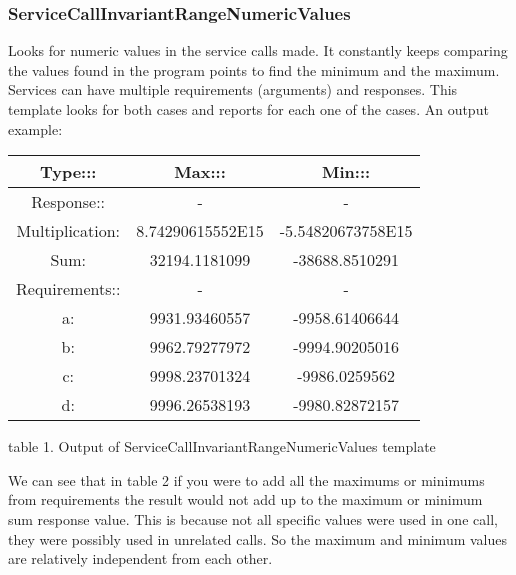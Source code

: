 \documentclass[10pt, conference]{IEEEtran}
\begin{document}
\subsubsection{ServiceCallInvariantRangeNumericValues}
Looks for numeric values in the service calls made. It constantly keeps comparing the values found in the program points to find the minimum and the maximum. Services can have multiple requirements (arguments) and responses. This template looks for both cases and reports for each one of the cases. An output example: 
\begin{table}[h!]

 \begin{tabular}{|c|c|c|} 
\hline
Type::: & Max::: & Min:::  \\
\hline
Response:: & - & - \\
Multiplication: & 8.74290615552E15 &  -5.54820673758E15 \\
Sum:  & 32194.1181099 &  -38688.8510291  \\ 

Requirements::  & - & -\\
a: & 9931.93460557  & -9958.61406644\\
b: & 9962.79277972 & -9994.90205016 \\
c: & 9998.23701324  & -9986.0259562 \\
d: & 9996.26538193 & -9980.82872157 \\ [1ex] 
\hline
 \end{tabular}
 \begin{tablenotes}
	\scriptsize
      \item table 1. Output of ServiceCallInvariantRangeNumericValues template
    \end{tablenotes}
\end{table}

\normalsize
We can see that in table 2  if you were to add all the maximums or minimums from requirements the result would not add up to the maximum or minimum sum response value.  This is because not all specific values were used in one call, they were possibly used in unrelated calls. So the maximum and minimum values are relatively independent from each other. 
\end{document}
